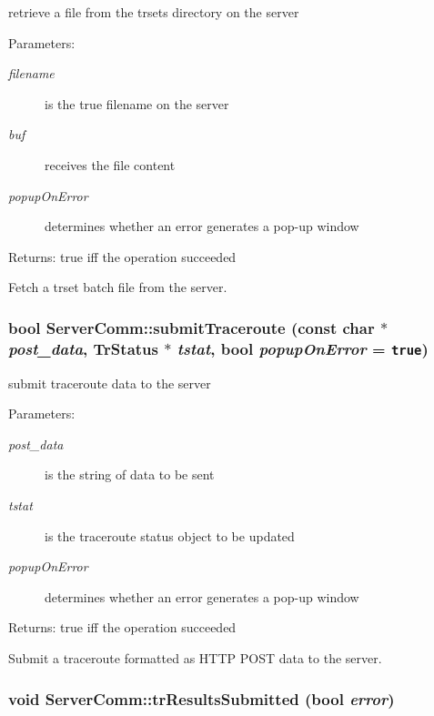 retrieve a file from the trsets directory on the server \begin{Desc}
\item[Parameters:]
\begin{description}
\item[{\em filename}]is the true filename on the server \item[{\em buf}]receives the file content \item[{\em popupOnError}]determines whether an error generates a pop-up window \end{description}
\end{Desc}
\begin{Desc}
\item[Returns:]true iff the operation succeeded\end{Desc}
Fetch a trset batch file from the server. \hypertarget{classServerComm_b7e0486d46e28e2bf8847e770916d98d}{
\subsubsection[submitTraceroute]{\setlength{\rightskip}{0pt plus 5cm}bool ServerComm::submitTraceroute (const char $\ast$ {\em post\_\-data}, \/  {\bf TrStatus} $\ast$ {\em tstat}, \/  bool {\em popupOnError} = {\tt true})}}
\label{classServerComm_b7e0486d46e28e2bf8847e770916d98d}


submit traceroute data to the server \begin{Desc}
\item[Parameters:]
\begin{description}
\item[{\em post\_\-data}]is the string of data to be sent \item[{\em tstat}]is the traceroute status object to be updated \item[{\em popupOnError}]determines whether an error generates a pop-up window \end{description}
\end{Desc}
\begin{Desc}
\item[Returns:]true iff the operation succeeded\end{Desc}
Submit a traceroute formatted as HTTP POST data to the server. \hypertarget{classServerComm_d1099a80e50d54d10f9d45988c5a6b6b}{
\subsubsection[trResultsSubmitted]{\setlength{\rightskip}{0pt plus 5cm}void ServerComm::trResultsSubmitted (bool {\em error})}}
\label{classServerComm_d1099a80e50d54d10f9d45988c5a6b6b}


